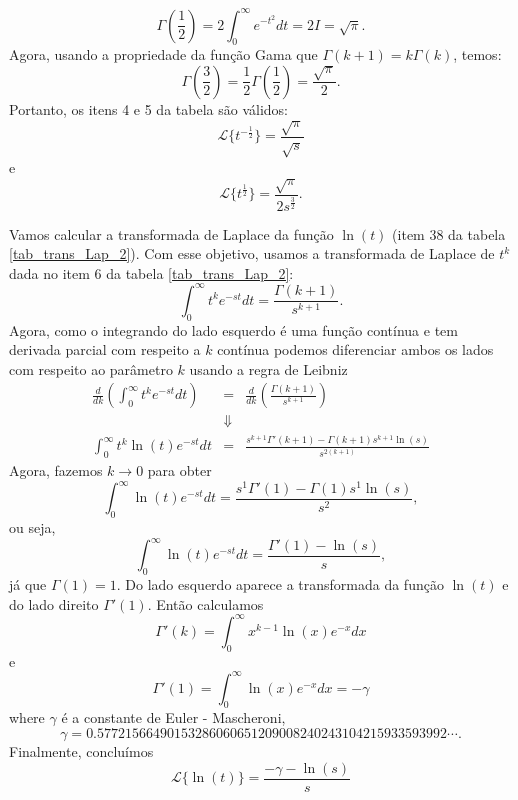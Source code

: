 \begin{ex}
\begin{equation}
\Gamma\left(\frac{1}{2}\right)=2\int_{0}^{\infty}e^{-t^2}dt=2I=\sqrt{\pi}.
\end{equation}
Agora, usando a propriedade da função Gama que $\Gamma(k+1)=k\Gamma(k)$, temos:
\begin{equation}
\Gamma\left(\frac{3}{2}\right)=\frac{1}{2}\Gamma\left(\frac{1}{2}\right)=\frac{\sqrt{\pi}}{2}.
\end{equation}
Portanto, os itens 4 e 5 da tabela são válidos:
\begin{equation}
 \mathcal{L}\{t^{-\frac{1}{2}}\}=\frac{\sqrt{\pi}}{\sqrt{s}}
\end{equation}
e
\begin{equation}
 \mathcal{L}\{t^{\frac{1}{2}}\}=\frac{\sqrt{\pi}}{2s^{\frac{3}{2}}}.
\end{equation}
 \end{ex}
\begin{ex}Vamos calcular a transformada de Laplace da função $\ln(t)$ (item 38 da tabela \ref{tab_trans_Lap_2}). Com esse objetivo, usamos a transformada de Laplace de $t^k$ dada no item 6 da tabela \ref{tab_trans_Lap_2}:
\begin{equation}
\int_0^\infty t^ke^{-st}dt=\frac{\Gamma(k+1)}{s^{k+1}}.
\end{equation}
Agora, como o integrando do lado esquerdo é uma função contínua e tem derivada parcial com respeito a $k$ contínua podemos diferenciar ambos os lados com respeito ao parâmetro $k$ usando a regra de Leibniz
\begin{eqnarray*}
\frac{d}{dk}\left(\int_0^\infty t^ke^{-st}dt\right)&=&\frac{d}{dk}\left(\frac{\Gamma(k+1)}{s^{k+1}}\right)\\
&\Downarrow&\\
\int_0^\infty t^k \ln(t) e^{-st}dt&=&\frac{s^{k+1}\Gamma'(k+1)-\Gamma(k+1)s^{k+1}\ln(s)}{s^{2(k+1)}}
\end{eqnarray*}
Agora, fazemos $k\to 0$ para obter
\begin{equation}
\int_0^\infty \ln(t) e^{-st}dt=\frac{s^{1}\Gamma'(1)-\Gamma(1)s^{1}\ln(s)}{s^{2}},
\end{equation}
ou seja,
\begin{equation}
\int_0^\infty \ln(t) e^{-st}dt=\frac{\Gamma'(1)-\ln(s)}{s},
\end{equation}
já que $\Gamma(1)=1$. Do lado esquerdo aparece a transformada da função $\ln(t)$ e do lado direito $\Gamma'(1)$. Então calculamos
\begin{equation}
\Gamma'(k)=\int_0^\infty x^{k-1}\ln(x) e^{-x}dx
\end{equation}
e
\begin{equation}
\Gamma'(1)=\int_0^\infty \ln(x) e^{-x} dx=-\gamma
\end{equation}
where $\gamma$ é a constante de Euler - Mascheroni,
\begin{equation}
\gamma=0.57721566490153286060651209008240243104215933593992\cdots.
\end{equation}
Finalmente, concluímos
\begin{equation}
\mathcal{L}\{\ln(t)\}=\frac{-\gamma-\ln(s)}{s}
\end{equation}
\end{ex}

